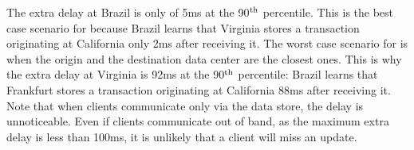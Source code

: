 The extra delay at Brazil is only of 5ms at the 90$^{\rm th}$
percentile. This is the best case scenario for
\Uniform because Brazil learns that Virginia
stores a transaction originating at California only 2ms after 
receiving it. The worst case scenario for \Uniform is when the origin and the
destination data center are the closest ones. This is why the extra
delay at Virginia is 92ms at the 90$^{\rm th}$
percentile: Brazil learns that Frankfurt stores a transaction
originating at California 88ms after receiving it. Note that when clients 
communicate only via the data store, the delay is
unnoticeable. Even if clients communicate out of band, as the maximum extra
delay is less than 100ms, it is unlikely that a client will
miss an update.



